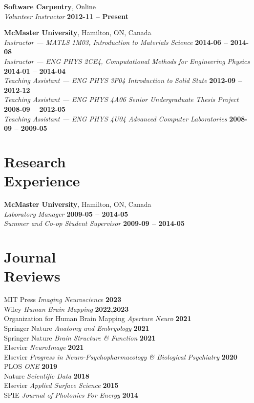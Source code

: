\documentclass[margin1,line,canadian]{resume}
\begin{document}
\begin{resume}
 \textbf{Software Carpentry}, Online\\%
 \textsl{Volunteer Instructor} \hfill \textbf{2012-11 -- Present}

 \vspace{-2mm}
 \textbf{McMaster University}, Hamilton, ON, Canada \\%
 \textsl{Instructor --- MATLS 1M03, Introduction to Materials Science} \hfill \textbf{2014-06 -- 2014-08}\\
 \textsl{Instructor --- ENG PHYS 2CE4, Computational Methods for Engineering Physics} \hfill \textbf{2014-01 -- 2014-04}\\
 \textsl{Teaching Assistant --- ENG PHYS 3F04 Introduction to Solid State} \hfill \textbf{2012-09 -- 2012-12}\\
 \textsl{Teaching Assistant --- ENG PHYS 4A06 Senior Undergraduate Thesis Project} \hfill  \textbf{2008-09 -- 2012-05}\\
 \textsl{Teaching Assistant --- ENG PHYS 4U04 Advanced Computer Laboratories} \hfill \textbf{2008-09 -- 2009-05}

 \section{\mysidestyle{}Research\\Experience}
 \textbf{McMaster University}, Hamilton, ON, Canada\\%
 \textsl{Laboratory Manager} \hfill \textbf{2009-05 -- 2014-05}\\
 \textsl{Summer and Co-op Student Supervisor} \hfill \textbf{2009-09 -- 2014-05}

\section{\mysidestyle{}Journal\\Reviews}
MIT Press \textsl{Imaging Neuroscience} \hfill \textbf{2023}\\
Wiley \textsl{Human Brain Mapping} \hfill \textbf{2022,2023}\\
Organization for Human Brain Mapping \textsl{Aperture Neuro} \hfill \textbf{2021}\\
Springer Nature \textsl{Anatomy and Embryology} \hfill \textbf{2021}\\
Springer Nature \textsl{Brain Structure \& Function} \hfill \textbf{2021}\\
Elsevier \textsl{NeuroImage} \hfill \textbf{2021}\\
Elsevier \textsl{Progress in Neuro-Psychopharmacology \& Biological Psychiatry} \hfill \textbf{2020}\\
PLOS \textsl{ONE} \hfill \textbf{2019}\\
Nature \textsl{Scientific Data} \hfill \textbf{2018}\\
Elsevier \textsl{Applied Surface Science} \hfill \textbf{2015}\\
SPIE \textsl{Journal of Photonics For Energy} \hfill \textbf{2014}


\end{resume}
\end{document}
